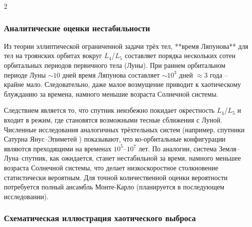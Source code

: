 \documentclass[11pt,a4paper]{article}
\begin{document}
\begin{multicols}{2}
		\subsubsection{Аналитические оценки нестабильности}
		
		Из теории эллиптической ограниченной задачи трёх тел,
		**время Ляпунова** для тел на троянских орбитах вокруг \(L_4\)/\(L_5\)
		составляет порядка нескольких сотен орбитальных периодов первичного тела (Луны).
		При раннем орбитальном периоде Луны \(\sim 10\) дней время Ляпунова составляет
		\(\sim 10^{3}\) дней \(\approx 3\) года – крайне мало. Следовательно, даже
		малое возмущение приводит к хаотическому блужданию за времена, намного меньшие возраста Солнечной системы.
		
		Следствием является то, что спутник неизбежно покидает окрестность
		\(L_4\)/\(L_5\) и входит в режим, где становятся возможными тесные сближения с Луной.
		Численные исследования аналогичных трёхтельных систем
		(например, спутники Сатурна Янус–Эпиметей \cite{JanusEpimetheus}) показывают, что ко‑орбитальные конфигурации
		являются преходящими на временах \(10^{5}\)–\(10^{7}\) лет.
		По аналогии, система Земля–Луна–спутник, как ожидается, станет нестабильной за время, намного меньшее возраста Солнечной системы, что делает низкоскоростное столкновение статистически вероятным. Для точной количественной оценки вероятности потребуется полный ансамбль Монте-Карло (планируется в последующем исследовании).
		
		\subsubsection{Схематическая иллюстрация хаотического выброса}
		

\end{multicols}
\end{document}
